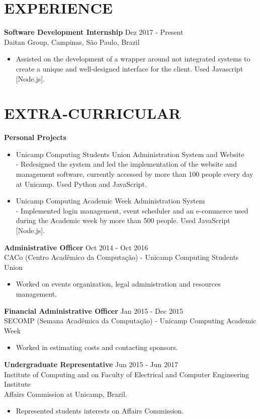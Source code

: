 \documentclass[margin, 10pt]{res} %
\begin{document}
\begin{resume}
\section{EXPERIENCE}
{\bf Software Development Internship} \hfill Dez 2017 - Present \\
Daitan Group, Campinas, São Paulo, Brazil
\begin{itemize}
\item Assisted on the development of a wrapper around not integrated systems to create a unique and well-designed interface for the client. Used Javascript [Node.js].\\
\end{itemize}

\section{EXTRA-CURRICULAR}
{\bf Personal Projects}
\begin{itemize} \itemsep -1pt %
\item Unicamp Computing Students Union Administration System and Website\\
	 - Redesigned the system and led the implementation of the website and management software, currently accessed by more than 100 people every day at Unicamp. Used Python and JavaScript.
\item Unicamp Computing Academic Week Administration System\\
	 - Implemented login management, event scheduler and an e-commerce used during the Academic week by more than 500 people. Used JavaScript [Node.js].
\end{itemize}

{\bf Administrative Officer} \hfill Oct 2014 - Oct 2016 \\
CACo (Centro Acadêmico da Computação) - Unicamp Computing Students Union
\begin{itemize} \itemsep -1pt %
\item Worked on events organization, legal administration and resources management.
\end{itemize}

{\bf Financial Administrative Officer} \hfill Jan 2015 - Dec 2015 \\
SECOMP (Semana Acadêmica da Computação) - Unicamp Computing Academic Week
\begin{itemize} \itemsep -1pt %
\item Worked in estimating costs and contacting sponsors.
\end{itemize}

{\bf Undergraduate Representative} \hfill Jun 2015 - Jun 2017 \\
Institute of Computing and on Faculty of Electrical and Computer Engineering Institute \\ Affairs Commission at Unicamp, Brazil.
\begin{itemize} \itemsep -1pt %
\item Represented students interests on Affairs Commission.
\end{itemize}

\end{resume}
\end{document}
